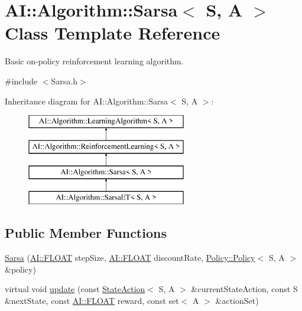 \hypertarget{classAI_1_1Algorithm_1_1Sarsa}{\section{A\+I\+:\+:Algorithm\+:\+:Sarsa$<$ S, A $>$ Class Template Reference}
\label{classAI_1_1Algorithm_1_1Sarsa}
}


Basic on-\/policy reinforcement learning algorithm.  




{\ttfamily \#include $<$Sarsa.\+h$>$}

Inheritance diagram for A\+I\+:\+:Algorithm\+:\+:Sarsa$<$ S, A $>$\+:\begin{figure}[H]
\begin{center}
\leavevmode
\includegraphics[height=4.000000cm]{classAI_1_1Algorithm_1_1Sarsa}
\end{center}
\end{figure}
\subsection*{Public Member Functions}
\begin{DoxyCompactItemize}
\item 
\hyperlink{classAI_1_1Algorithm_1_1Sarsa_a02dae564a53ea2284a23d047a8998fca}{Sarsa} (\hyperlink{namespaceAI_a41b74884a20833db653dded3918e05c3}{A\+I\+::\+F\+L\+O\+A\+T} step\+Size, \hyperlink{namespaceAI_a41b74884a20833db653dded3918e05c3}{A\+I\+::\+F\+L\+O\+A\+T} discount\+Rate, \hyperlink{classAI_1_1Algorithm_1_1Policy_1_1Policy}{Policy\+::\+Policy}$<$ S, A $>$ \&policy)
\item 
virtual void \hyperlink{classAI_1_1Algorithm_1_1Sarsa_ae1d62478d3e31cace3fb594e05f83d1c}{update} (const \hyperlink{classAI_1_1StateAction}{State\+Action}$<$ S, A $>$ \&current\+State\+Action, const S \&next\+State, const \hyperlink{namespaceAI_a41b74884a20833db653dded3918e05c3}{A\+I\+::\+F\+L\+O\+A\+T} reward, const set$<$ A $>$ \&action\+Set)
\end{DoxyCompactItemize}
